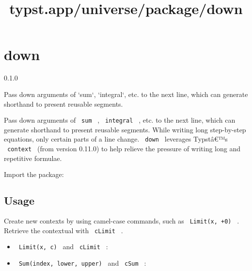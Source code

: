 \title{typst.app/universe/package/down}

\label{banner}
\section{down}\label{down}

{ 0.1.0 }

Pass down arguments of `sum`, `integral`, etc. to the next line, which
can generate shorthand to present reusable segments.

\label{readme}
Pass down arguments of \texttt{\ sum\ } , \texttt{\ integral\ } , etc.
to the next line, which can generate shorthand to present reusable
segments. While writing long step-by-step equations, only certain parts
of a line change. \texttt{\ down\ } leverages Typstâ€™s
\texttt{\ context\ } (from version 0.11.0) to help relieve the pressure
of writing long and repetitive formulae.

Import the package:

\begin{Shaded}
\begin{Highlighting}[]
\end{Highlighting}
\end{Shaded}

\subsection{Usage}\label{usage}

Create new contexts by using camel-case commands, such as
\texttt{\ Limit(x,\ +0)\ } . Retrieve the contextual with
\texttt{\ cLimit\ } .

\begin{itemize}
\tightlist
\item
  \texttt{\ Limit(x,\ c)\ } and \texttt{\ cLimit\ } :
\end{itemize}

\begin{Shaded}
\begin{Highlighting}[]
\NormalTok{$}
\NormalTok{$}
\end{Highlighting}
\end{Shaded}

\begin{itemize}
\tightlist
\item
  \texttt{\ Sum(index,\ lower,\ upper)\ } and \texttt{\ cSum\ } :
\end{itemize}

